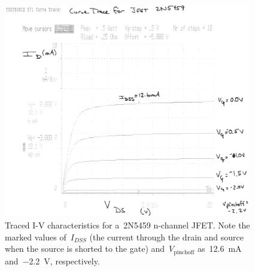 \begin{figure}[H]
	\centering
	\includegraphics[width=4.25in]{img/jfetCurveTrace.png}
	\parbox{4.25in}{
	\caption{Traced I-V characteristics for a~2N5459 n-channel JFET.  Note the
	marked values of~$I_{DSS}$ (the current through the drain and source when the source is shorted to the gate) and~$V_{\text{pinchoff}}$
	as~\SI{12.6}{\milli\ampere} and~\SI{-2.2}{\volt}, respectively.}
	\label{fig:jfetCurve}}
\end{figure}


